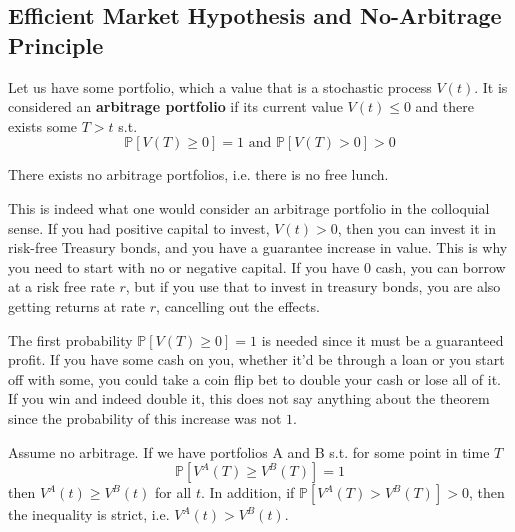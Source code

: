 \documentclass{article}
\begin{document}
  \subsection{Efficient Market Hypothesis and No-Arbitrage Principle}

    \begin{definition}
			\label{def:arbitrage_portfolio}
      Let us have some portfolio, which a value that is a stochastic process $V (t)$. It is considered an \textbf{arbitrage portfolio} if its current value $V(t) \leq 0$ and there exists some $T > t$ s.t. 
      \begin{equation}
        \mathbb{P}[V(T) \geq 0] = 1 \text{ and } \mathbb{P}[V(T) > 0] > 0
      \end{equation}
    \end{definition}

    \begin{theorem}
      \label{thm:axiom-of-no-arbitrage}
      There exists no arbitrage portfolios, i.e. there is no free lunch. 
    \end{theorem}

    This is indeed what one would consider an arbitrage portfolio in the colloquial sense. If you had positive capital to invest, $V(t) > 0$, then you can invest it in risk-free Treasury bonds, and you have a guarantee increase in value. This is why you need to start with no or negative capital. If you have $0$ cash, you can borrow at a risk free rate $r$, but if you use that to invest in treasury bonds, you are also getting returns at rate $r$, cancelling out the effects. 

    The first probability $\mathbb{P}[V(T) \geq 0] = 1$ is needed since it must be a guaranteed profit. If you have some cash on you, whether it'd be through a loan or you start off with some, you could take a coin flip bet to double your cash or lose all of it. If you win and indeed double it, this does not say anything about the theorem since the probability of this increase was not $1$. 

    \begin{theorem}
      \label{thm:monotonicity-theorem}
      Assume no arbitrage. If we have portfolios A and B s.t. for some point in time $T$ 
      \begin{equation}
        \mathbb{P}[V^A (T) \geq V^B (T)] = 1 
      \end{equation}
      then $V^A (t) \geq V^B (t)$ for all $t$. In addition, if $\mathbb{P}[V^A (T) > V^B (T)] > 0$, then the inequality is strict, i.e. $V^A (t) > V^B (t)$. 
    \end{theorem}
    
\end{document}
